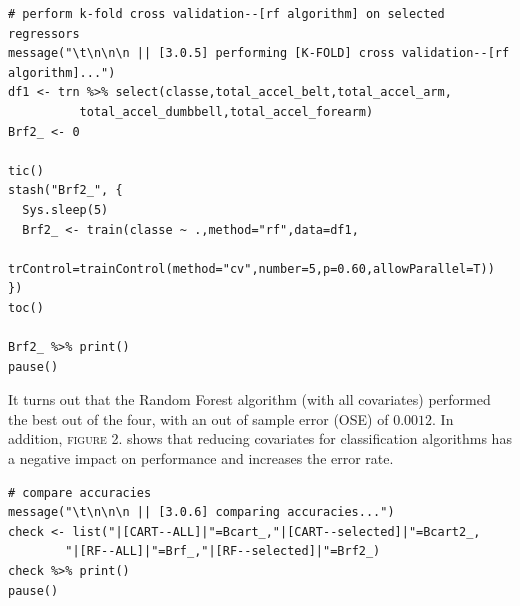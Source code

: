 \documentclass[10pt, twoside]{article}
\begin{document}
\begin{verbatim}
# perform k-fold cross validation--[rf algorithm] on selected regressors
message("\t\n\n\n || [3.0.5] performing [K-FOLD] cross validation--[rf algorithm]...")
df1 <- trn %>% select(classe,total_accel_belt,total_accel_arm,
          total_accel_dumbbell,total_accel_forearm)
Brf2_ <- 0

tic()
stash("Brf2_", {
  Sys.sleep(5)
  Brf2_ <- train(classe ~ .,method="rf",data=df1,
           trControl=trainControl(method="cv",number=5,p=0.60,allowParallel=T))
})
toc()

Brf2_ %>% print()
pause()
\end{verbatim}

\noindent
It turns out that the Random Forest algorithm (with all covariates) performed the best out
of the four, with an out of sample error (OSE) of $0.0012$. In addition, \textsc{figure 2.}
shows that reducing covariates for classification algorithms has a negative impact on
performance and increases the error rate.
\bigskip

\begin{verbatim}
# compare accuracies
message("\t\n\n\n || [3.0.6] comparing accuracies...")
check <- list("|[CART--ALL]|"=Bcart_,"|[CART--selected]|"=Bcart2_,
        "|[RF--ALL]|"=Brf_,"|[RF--selected]|"=Brf2_)
check %>% print()
pause()
\end{verbatim}
\end{document}
